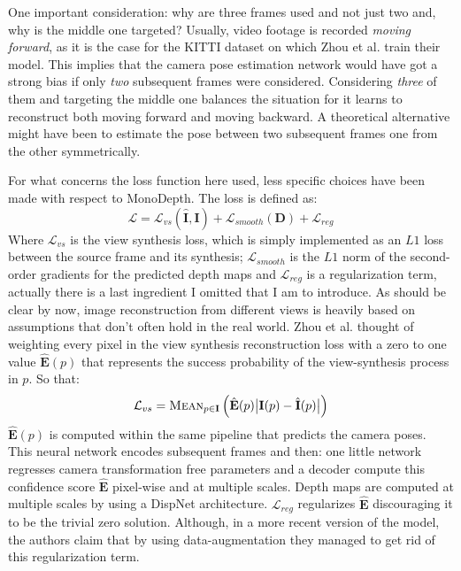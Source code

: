 One important consideration: why are three frames used and not just two and, why is the middle one targeted?
Usually, video footage is recorded \textit{moving forward}, as it is the case for the KITTI dataset on which Zhou et al. train their model.
This implies that the camera pose estimation network would have got a strong bias if only \textit{two} subsequent frames were considered.
Considering \textit{three} of them and targeting the middle one balances the situation for it learns to reconstruct both moving forward and moving backward.
A theoretical alternative might have been to estimate the pose between two subsequent frames one from the other symmetrically.

For what concerns the loss function here used, less specific choices have been made with respect to MonoDepth.
The loss is defined as:
\[
	\mathcal{L} = \mathcal{L}_{vs}(\hat{\mathbf{I}}, \mathbf{I}) + \mathcal{L}_{smooth}(\mathbf{D}) + \mathcal{L}_{reg}
\]
Where $\mathcal{L}_{vs}$ is the view synthesis loss, which is simply implemented as an $L1$ loss between the source frame and its synthesis; $\mathcal{L}_{smooth}$ is the $L1$ norm of the second-order gradients for the predicted depth maps and $\mathcal{L}_{reg}$ is a regularization term, actually there is a last ingredient I omitted that I am to introduce.
As should be clear by now, image reconstruction from different views is heavily based on assumptions that don't often hold in the real world.
Zhou et al. thought of weighting every pixel in the view synthesis reconstruction loss with a zero to one value $\hat{\mathbf{E}}(p)$ that represents the success probability of the view-synthesis process in $p$.
So that:
\[
	\mathcal{L}_{vs} = \textsc{Mean}_{p \in \mathbf{I}}
		\left(
			\hat{\mathbf{E}}(p) \big| \mathbf{I}(p) - \hat{\mathbf{I}}(p) \big|
		\right)
\]
$\hat{\mathbf{E}}(p)$ is computed within the same pipeline that predicts the camera poses.
This neural network encodes subsequent frames and then: one little network regresses camera transformation free parameters and a decoder compute this confidence score $\hat{\mathbf{E}}$ pixel-wise and at multiple scales.
Depth maps are computed at multiple scales by using a DispNet \cite{DispNet} architecture.
$\mathcal{L}_{reg}$ regularizes $\hat{\mathbf{E}}$ discouraging it to be the trivial zero solution.
Although, in a more recent version of the model, the authors claim that by using data-augmentation they managed to get rid of this regularization term.

